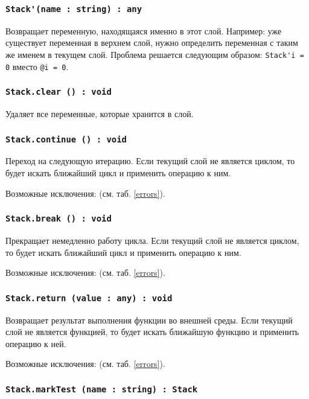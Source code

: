\subsubsection{\lstinline|Stack'(name : string) : any|}

Возвращает переменную, находящаяся именно в этот слой. Например: уже существует переменная  в верхнем слой, нужно определить переменная с таким же именем в текущем слой. Проблема решается следующим образом: \lstinline|Stack'i = 0| вместо \lstinline|@i = 0|.

\subsubsection{\lstinline|Stack.clear () : void|}

Удаляет все переменные, которые хранится в слой.

\subsubsection{\lstinline|Stack.continue () : void|}

Переход на следующую итерацию. Если текущий слой не является циклом, то будет искать ближайший цикл и применить операцию к ним.

Возможные исключения:  (см. таб. \ref{errors}).

\subsubsection{\lstinline|Stack.break () : void|}

Прекращает немедленно работу цикла. Если текущий слой не является циклом, то будет искать ближайший цикл и применить операцию к ним.

Возможные исключения:  (см. таб. \ref{errors}).

\subsubsection{\lstinline|Stack.return (value : any) : void|}

Возвращает результат выполнения функции во внешней среды. Если текущий слой не является функцией, то будет искать ближайшую функцию и применить операцию к ней.

Возможные исключения:  (см. таб. \ref{errors}).

\subsubsection{\lstinline|Stack.markTest (name : string) : Stack|}

